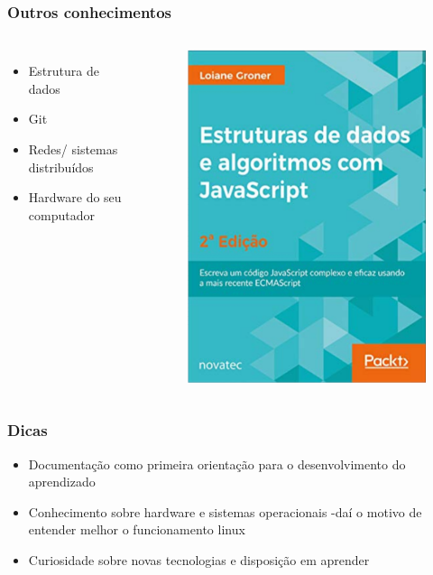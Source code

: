 \documentclass[    
  12pt, 
  compress,
  aspectratio=169,
  blue
  ]{beamer}
\begin{document}
\begin{frame}
\frametitle{ Outros conhecimentos}   
\begin{columns}[c]
\begin{itemize}
\item<1-> Estrutura de dados
\item<2-> Git
\item<3-> Redes/ sistemas distribuídos
\item<4-> Hardware do seu computador
\end{itemize}
\centering
\begin{figure}
\includegraphics[scale=0.3]{estrutura}
\end{figure}
\end{columns}
\end{frame}
\begin{frame}
\frametitle{ Dicas}   

\begin{itemize}
\item<1-> Documentação como primeira orientação para o desenvolvimento do aprendizado
\item<2-> Conhecimento sobre hardware e sistemas operacionais -daí o motivo de entender melhor o funcionamento linux
\item<3-> Curiosidade sobre novas tecnologias e disposição em aprender

\end{itemize}

\end{frame}
\end{document}
